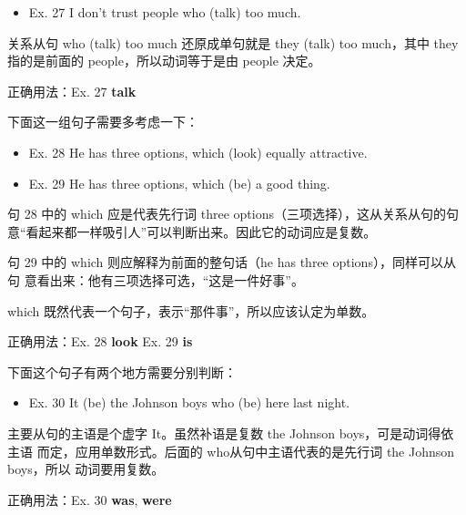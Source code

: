 \begin{mybox}

  \begin{itemize}
  \item   Ex. 27 I don't trust people who (talk) too much.
  \end{itemize}

  关系从句 who (talk) too much 还原成单句就是 they (talk) too much，其中
  they 指的是前面的 people，所以动词等于是由 people 决定。

  \tcblower

  正确用法：Ex. 27 \textbf{talk}
\end{mybox}

下面这一组句子需要多考虑一下：
\begin{mybox}

  \begin{itemize}
  \item   Ex. 28 He has three options, which (look) equally attractive.
  \item   Ex. 29 He has three options, which (be) a good thing.
  \end{itemize}

  句 28 中的 which 应是代表先行词 three options（三项选择），这从关系从句的句
  意“看起来都一样吸引人”可以判断出来。因此它的动词应是复数。

  句 29 中的 which 则应解释为前面的整句话（he has three options），同样可以从句
  意看出来：他有三项选择可选，“这是一件好事”。

  which 既然代表一个句子，表示“那件事”，所以应该认定为单数。

  \tcblower

  正确用法：Ex. 28 \textbf{look} \qquad\quad Ex. 29 \textbf{is}
\end{mybox}

下面这个句子有两个地方需要分别判断：

\begin{mybox}

  \begin{itemize}
  \item   Ex. 30 It (be) the Johnson boys who (be) here last night.
  \end{itemize}

  主要从句的主语是个虚字 It。虽然补语是复数 the Johnson boys，可是动词得依主语
  而定，应用单数形式。后面的 who从句中主语代表的是先行词 the Johnson boys，所以
  动词要用复数。

  \tcblower

  正确用法：Ex. 30 \textbf{was}, \textbf{were}
\end{mybox}

